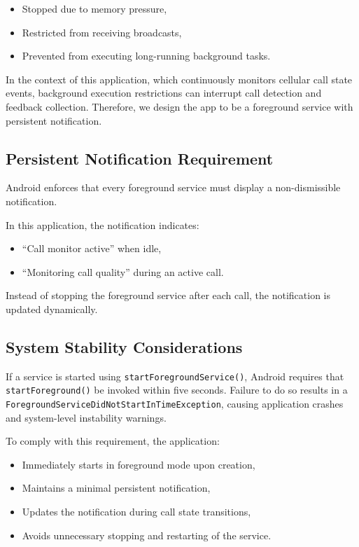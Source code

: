 \documentclass{article}
\begin{document}
\begin{itemize}
    \item Stopped due to memory pressure,
    \item Restricted from receiving broadcasts,
    \item Prevented from executing long-running background tasks.
\end{itemize}

In the context of this application, which continuously monitors cellular call state events, background execution restrictions can interrupt call detection and feedback collection. Therefore, we design the app to be a foreground service with persistent notification.

\subsection{Persistent Notification Requirement}

Android enforces that every foreground service must display a non-dismissible notification.

In this application, the notification indicates:

\begin{itemize}
    \item ``Call monitor active'' when idle,
    \item ``Monitoring call quality'' during an active call.
\end{itemize}

Instead of stopping the foreground service after each call, the notification is updated dynamically. 

\subsection{System Stability Considerations}

If a service is started using \texttt{startForegroundService()}, Android requires that \texttt{startForeground()} be invoked within five seconds. Failure to do so results in a \texttt{ForegroundServiceDidNotStartInTimeException}, causing application crashes and system-level instability warnings.

To comply with this requirement, the application:

\begin{itemize}
    \item Immediately starts in foreground mode upon creation,
    \item Maintains a minimal persistent notification,
    \item Updates the notification during call state transitions,
    \item Avoids unnecessary stopping and restarting of the service.
\end{itemize}
\end{document}
